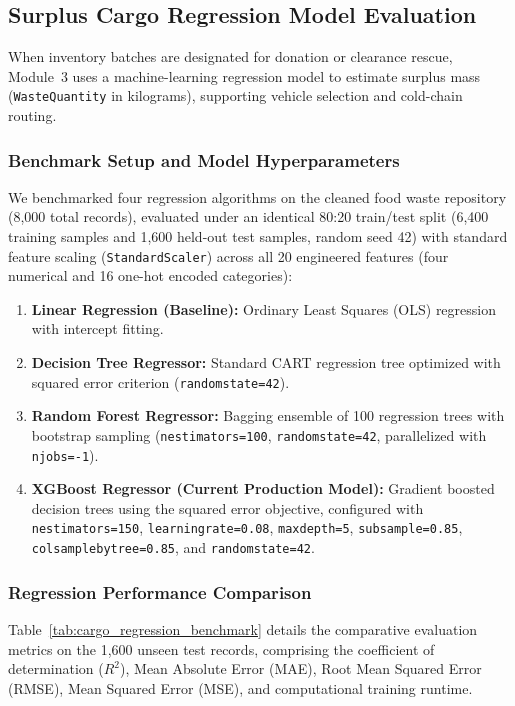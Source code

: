 \documentclass[12pt,a4paper]{article}
\renewcommand{\_}{\oldunderscore\allowbreak}
\begin{document}
\subsection{Surplus Cargo Regression Model Evaluation}
\label{sec:cargo_regression_results}

When inventory batches are designated for donation or clearance rescue, Module~3 uses a machine-learning regression model to estimate surplus mass (\texttt{Waste\_Quantity} in kilograms), supporting vehicle selection and cold-chain routing.

\subsubsection{Benchmark Setup and Model Hyperparameters}
We benchmarked four regression algorithms on the cleaned food waste repository (8,000 total records), evaluated under an identical 80:20 train/test split (6,400 training samples and 1,600 held-out test samples, random seed 42) with standard feature scaling (\texttt{StandardScaler}) across all 20 engineered features (four numerical and 16 one-hot encoded categories):
\begin{enumerate}[leftmargin=18pt, itemsep=2pt]
    \item \textbf{Linear Regression (Baseline):} Ordinary Least Squares (OLS) regression with intercept fitting.
    \item \textbf{Decision Tree Regressor:} Standard CART regression tree optimized with squared error criterion (\texttt{random\_state=42}).
    \item \textbf{Random Forest Regressor:} Bagging ensemble of 100 regression trees with bootstrap sampling (\texttt{n\_estimators=100}, \texttt{random\_state=42}, parallelized with \texttt{n\_jobs=-1}).
    \item \textbf{XGBoost Regressor (Current Production Model):} Gradient boosted decision trees using the squared error objective, configured with \texttt{n\_estimators=150}, \texttt{learning\_rate=0.08}, \texttt{max\_depth=5}, \texttt{subsample=0.85}, \texttt{colsample\_bytree=0.85}, and \texttt{random\_state=42}.
\end{enumerate}

\subsubsection{Regression Performance Comparison}
Table~\ref{tab:cargo_regression_benchmark} details the comparative evaluation metrics on the 1,600 unseen test records, comprising the coefficient of determination ($R^2$), Mean Absolute Error (MAE), Root Mean Squared Error (RMSE), Mean Squared Error (MSE), and computational training runtime.
\end{document}

